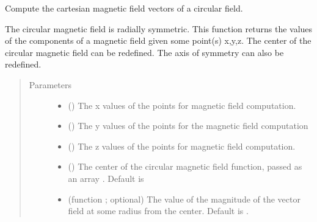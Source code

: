 \documentclass[letterpaper,10pt,english]{sphinxmanual}
\begin{document}
\begin{fulllineitems}
\label{\detokenize{magnetic_field_functions_3d:magnetic_field_functions_3d.circular_magnetic_field_cart_3d}}
Compute the cartesian magnetic field vectors of a circular field.

The circular magnetic field is radially symmetric. This function
returns the values of the components of a magnetic field given some
point(s) x,y,z. The center of the circular magnetic field can be
redefined. The axis of symmetry can also be redefined.
\begin{quote}\begin{description}
\item[{Parameters}] \leavevmode\begin{itemize}
\item {} 
 () \textendash{} The x values of the points for magnetic field computation.

\item {} 
 () \textendash{} The y values of the points for the magnetic field computation

\item {} 
 () \textendash{} The z values of the points for magnetic field computation.

\item {} 
 () \textendash{} The center of the circular magnetic field function, passed as an
array \sphinxcode{\sphinxupquote{{[}x0,y0{]}}}. Default is \sphinxcode{\sphinxupquote{{[}0,0,0{]}}}

\item {} 
 (function ; optional) \textendash{} The value of the magnitude of the vector field at some radius from
the center. Default is .


\end{itemize}
\end{description}
\end{quote}
\end{fulllineitems}
\end{document}
